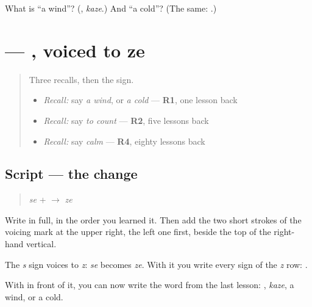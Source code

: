 \begin{tcolorbox}[breakable,colback=teal!4,colframe=teal!35!black,title={Before you move on}]
What is \textquotedblleft{}a wind\textquotedblright{}? (\textbf{}, \emph{kaze}.) And \textquotedblleft{}a cold\textquotedblright{}? (The same: \textbf{}.)
\end{tcolorbox}
\section[\texorpdfstring{\ja{ぜ} (ze)}{ぜ (ze)}]{ — , voiced to ze}

\label{lesson:JA-W136-ze}



\begin{quote}
Three recalls, then the sign.

\begin{itemize}
\raggedright
  \item \emph{Recall:} say \emph{a wind}, or \emph{a cold} — \textbf{R1}, one lesson back
  \item \emph{Recall:} say \emph{to count} — \textbf{R2}, five lessons back
  \item \emph{Recall:} say \emph{calm} — \textbf{R4}, eighty lessons back
\end{itemize}
\end{quote}

\subsection*{Script — the change}

\begin{quote}
\textbf{} \emph{se} + \textbf{} $\to$ \textbf{} \emph{ze}
\end{quote}

Write \textbf{} in full, in the order you learned it. Then add the two short strokes of the voicing mark at the upper right, the left one first, beside the top of the right-hand vertical.

The \emph{s} sign voices to \emph{z}: \emph{se} becomes \emph{ze}. With it you write every sign of the \emph{z} row: \textbf{    }.

With \textbf{} in front of it, you can now write the word from the last lesson: \textbf{}, \emph{kaze}, a wind, or a cold.

